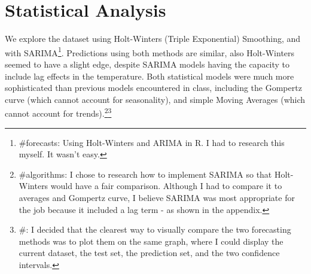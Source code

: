 \documentclass{article}
\begin{document}
\section*{Statistical Analysis}
We explore the dataset using Holt-Winters (Triple Exponential) Smoothing, and with SARIMA\footnote{\#forecasts: Using Holt-Winters and ARIMA in R. I had to research this myself. It wasn't easy.}. Predictions using both methods are similar, also Holt-Winters seemed to have a slight edge, despite SARIMA models having the capacity to include lag effects in the temperature. Both statistical models were much more sophisticated than previous models encountered in class, including the Gompertz curve (which cannot account for seasonality), and simple Moving Averages (which cannot account for trends).\footnote{\#algorithms: I chose to research how to implement SARIMA so that Holt-Winters would have a fair comparison. Although I had to compare it to averages and Gompertz curve, I believe SARIMA was most appropriate for the job because it included a lag term - as shown in the appendix.}\footnote{\dataviz#: I decided that the clearest way to visually compare the two forecasting methods was to plot them on the same graph, where I could display the current dataset, the test set, the prediction set, and the two confidence intervals.}
\end{document}
